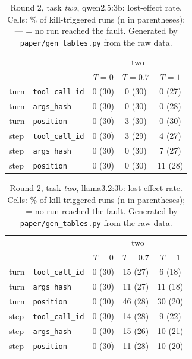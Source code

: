 \begin{table}[t]
\centering
\small
\begin{tabular}{llccc}
\toprule
 & & \multicolumn{3}{c}{two} \\
 & & $T{=}0$ & $T{=}0.7$ & $T{=}1$ \\
\midrule
turn & \texttt{tool\_call\_id} & 0 {\scriptsize(30)} & 0 {\scriptsize(30)} & 0 {\scriptsize(27)} \\
turn & \texttt{args\_hash} & 0 {\scriptsize(30)} & 0 {\scriptsize(30)} & 0 {\scriptsize(28)} \\
turn & \texttt{position} & 0 {\scriptsize(30)} & 3 {\scriptsize(30)} & 0 {\scriptsize(30)} \\
\midrule
step & \texttt{tool\_call\_id} & 0 {\scriptsize(30)} & 3 {\scriptsize(29)} & 4 {\scriptsize(27)} \\
step & \texttt{args\_hash} & 0 {\scriptsize(30)} & 0 {\scriptsize(30)} & 7 {\scriptsize(27)} \\
step & \texttt{position} & 0 {\scriptsize(30)} & 0 {\scriptsize(30)} & 11 {\scriptsize(28)} \\
\bottomrule
\end{tabular}
\caption{Round 2, task \emph{two}, qwen2.5:3b: lost-effect rate. Cells: \% of kill-triggered runs (n in parentheses); --- = no run reached the fault. Generated by \texttt{paper/gen\_tables.py} from the raw data.}
\label{tab:r2lostqwen2}
\end{table}

\begin{table}[t]
\centering
\small
\begin{tabular}{llccc}
\toprule
 & & \multicolumn{3}{c}{two} \\
 & & $T{=}0$ & $T{=}0.7$ & $T{=}1$ \\
\midrule
turn & \texttt{tool\_call\_id} & 0 {\scriptsize(30)} & 15 {\scriptsize(27)} & 6 {\scriptsize(18)} \\
turn & \texttt{args\_hash} & 0 {\scriptsize(30)} & 11 {\scriptsize(27)} & 11 {\scriptsize(18)} \\
turn & \texttt{position} & 0 {\scriptsize(30)} & 46 {\scriptsize(28)} & 30 {\scriptsize(20)} \\
\midrule
step & \texttt{tool\_call\_id} & 0 {\scriptsize(30)} & 14 {\scriptsize(28)} & 9 {\scriptsize(22)} \\
step & \texttt{args\_hash} & 0 {\scriptsize(30)} & 15 {\scriptsize(26)} & 10 {\scriptsize(21)} \\
step & \texttt{position} & 0 {\scriptsize(30)} & 11 {\scriptsize(28)} & 10 {\scriptsize(20)} \\
\bottomrule
\end{tabular}
\caption{Round 2, task \emph{two}, llama3.2:3b: lost-effect rate. Cells: \% of kill-triggered runs (n in parentheses); --- = no run reached the fault. Generated by \texttt{paper/gen\_tables.py} from the raw data.}
\label{tab:r2lostllama3}
\end{table}

